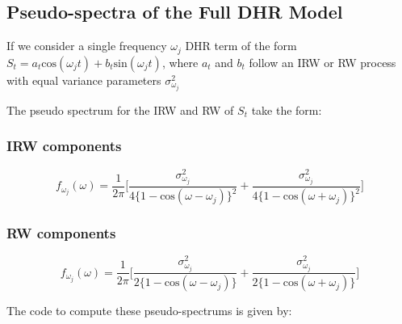 \documentclass{article}\usepackage[]{graphicx}\usepackage[]{color}
\begin{document}
\newpage

\subsection*{Pseudo-spectra of the Full DHR Model}

If we consider a single frequency $\omega_j$ DHR term of the form $S_t = a_t \text{cos}(\omega_j t) + b_t \text{sin}(\omega_j t) $, where $a_t$ and $b_t$ follow an IRW or RW process with equal variance parameters $\sigma^2_{\omega_j}$

The pseudo spectrum for the IRW and RW of $S_t$ take the form:

\subsubsection*{IRW components}

\begin{equation*}
f_{\omega_j}(\omega) = \dfrac{1}{2\pi} \Big[ \dfrac{\sigma^2_{\omega_j}}{4\{ 1 - \text{cos}(\omega - \omega_j)\}^2} + \dfrac{\sigma^2_{\omega_j}}{4\{ 1 - \text{cos}(\omega + \omega_j)\}^2}\Big]
\end{equation*}


\subsubsection*{RW components}

\begin{equation*}
f_{\omega_j}(\omega) = \dfrac{1}{2\pi} \Big[ \dfrac{\sigma^2_{\omega_j}}{2\{ 1 - \text{cos}(\omega - \omega_j)\}} + \dfrac{\sigma^2_{\omega_j}}{2\{ 1 - \text{cos}(\omega + \omega_j)\}}\Big]
\end{equation*}

\vspace{0.2cm}

The code to compute these pseudo-spectrums is given by:
\end{document}
